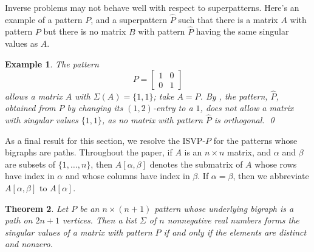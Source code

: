 \documentclass[preprint,12pt]{elsarticle}
\newtheorem{theorem}{Theorem}[section]
\newtheorem{Example}[theorem]{Example}
\begin{document}
Inverse problems may not behave well with respect to superpatterns.
Here's an example of a pattern $P$,  and a superpattern $\widehat{P}$
such that there is a matrix $A$ with pattern $P$ but there is no matrix $B$ with 
pattern $\widehat{P}$ having the same singular values as $A$. 
\begin{Example}
\label{badsuper}
\rm
The pattern 
\[
P= \left[ \begin{array} {cc} 
1 & 0 \\
0 & 1 \end{array} 
\right] 
\]
allows a matrix $A$ with $\Sigma (A)= \{ 1,1\}$; take $A=P$.
By , the pattern, $\widehat{P}$, obtained from $P$ by changing its $(1,2)$-entry to a $1$, 
does not allow a matrix with singular values $\{1,1\}$, as no matrix with pattern $\widehat{P}$ is 
orthogonal. \qed
\end{Example}

As a final result for this section, we resolve the ISVP-$P$
for the patterns whose  bigraphs are  paths. Throughout the paper, if $A$ is an $n\times n$ matrix, and $\alpha$
and $\beta$ are subsets of $\{1,\ldots,n\}$, then $A[\alpha,
\beta]$ denotes the submatrix of $A$ whose rows have index in $\alpha$ and whose columns have index in $\beta$.  If $\alpha=\beta$, then we abbreviate $A[\alpha,\beta]$ to $A[\alpha]$. 


\begin{theorem}
\label{Path}
Let $P$ be an $n\times (n+1)$ pattern whose underlying bigraph is a path on $2n+1$ vertices.  Then a list $\Sigma$ of $n$ nonnegative real numbers forms the singular values of a matrix with pattern $P$ if and only if the elements are distinct and nonzero.
\end{theorem}
\end{document}
